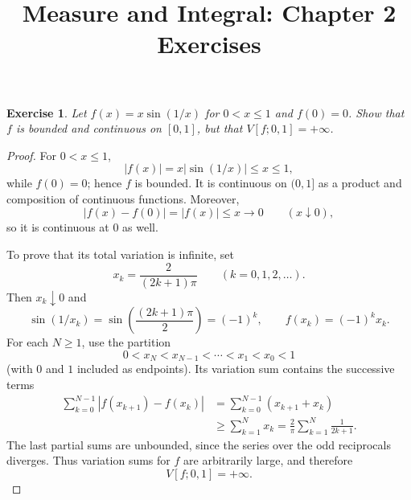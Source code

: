 \documentclass[12pt]{article}
\title{Measure and Integral: Chapter 2 Exercises}
\date{}
\newtheorem{exercise}{Exercise}
\begin{document}
\maketitle

\begin{exercise}
Let $f(x)=x\sin(1/x)$ for $0<x\le 1$ and $f(0)=0$. Show that $f$ is bounded and continuous on $[0,1]$, but that $V[f;0,1]=+\infty$.
\end{exercise}

\begin{proof}
For $0<x\le1$,
\[
 |f(x)|=x|\sin(1/x)|\le x\le1,
\]
while $f(0)=0$; hence $f$ is bounded.  It is continuous on $(0,1]$ as a product and composition of continuous functions.  Moreover,
\[
 |f(x)-f(0)|=|f(x)|\le x\longrightarrow0
 \qquad(x\downarrow0),
\]
so it is continuous at $0$ as well.

To prove that its total variation is infinite, set
\[
 x_k=\frac{2}{(2k+1)\pi}\qquad(k=0,1,2,\ldots).
\]
Then $x_k\downarrow0$ and
\[
 \sin(1/x_k)=\sin\!\left(\frac{(2k+1)\pi}{2}\right)=(-1)^k,
 \qquad f(x_k)=(-1)^k x_k.
\]
For each $N\ge1$, use the partition
\[
 0<x_N<x_{N-1}<\cdots<x_1<x_0<1
\]
(with $0$ and $1$ included as endpoints).  Its variation sum contains the successive terms
\begin{align*}
 \sum_{k=0}^{N-1}|f(x_{k+1})-f(x_k)|
 &=\sum_{k=0}^{N-1}(x_{k+1}+x_k)\\
 &\ge\sum_{k=1}^{N}x_k
 =\frac{2}{\pi}\sum_{k=1}^{N}\frac{1}{2k+1}.
\end{align*}
The last partial sums are unbounded, since the series over the odd reciprocals diverges.  Thus variation sums for $f$ are arbitrarily large, and therefore
\[
 V[f;0,1]=+\infty.
\]
\end{proof}
\end{document}
